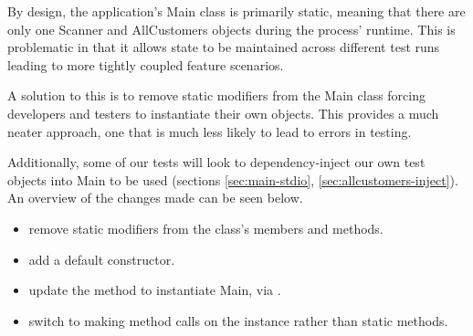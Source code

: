 By design, the application's Main class is primarily static, meaning that there are only one Scanner and AllCustomers objects during the process' runtime. This is problematic in that it allows state to be maintained across different test runs leading to more tightly coupled feature scenarios.
\par
A solution to this is to remove static modifiers from the Main class forcing developers and testers to instantiate their own objects. This provides a much neater approach, one that is much less likely to lead to errors in testing. 
\par
Additionally, some of our tests will look to dependency-inject our own test objects into Main to be used (sections \ref{sec:main-stdio}, \ref{sec:allcustomers-inject}). An overview of the changes made can be seen below.
\begin{itemize}
	\item remove static modifiers from the class's members and methods.  
	\item add a default constructor.
	\item update the  method to instantiate Main, via .
	\item switch to making method calls on the instance rather than static methods. 
\end{itemize}

